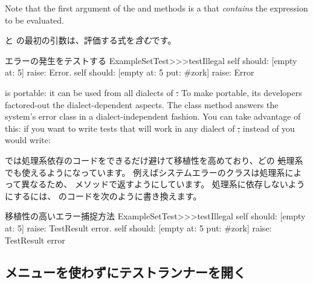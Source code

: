 \documentclass[a4paper,10pt,twoside]{book}
\begin{document}
{%


Note that the first argument of the  and  methods is a  that \emph{contains} the expression to be evaluated.   
\fi

 と  の最初の引数は、評価する式を\emph{含む}です。

\begin{method}[ESTtestIllegal]{エラーの発生をテストする}
ExampleSetTest>>>testIllegal
	self should: [empty at: 5] raise: Error.
	self should: [empty at: 5 put: #zork] raise: Error
\end{method}

\sunit is portable: it can be used from all dialects of \st.  To make
\sunit portable, its developers factored-out the dialect-dependent aspects.  The class method  answers
the system's error class in a dialect-independent fashion. 
You can take advantage of this: if you want to write tests that will work in any dialect of \st, instead of 
 you would write:
\fi

\sunit では処理系依存のコードをできるだけ避けて移植性を高めており、どの \st 処理系でも使えるようになっています。
例えばシステムエラーのクラスは処理系によって異なるため、  メソッドで返すようにしています。
処理系に依存しないようにするには、  のコードを次のように書き換えます。

\begin{method}[portabletestillegal]{移植性の高いエラー捕捉方法}
ExampleSetTest>>>testIllegal
	self should: [empty at: 5] raise: TestResult error.
	self should: [empty at: 5 put: #zork] raise: TestResult error
\end{method}


\subsection{メニューを使わずにテストランナーを開く}

}
\end{document}
